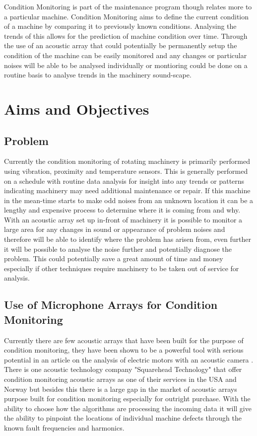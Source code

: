 \documentclass{UoNMCHA}
\numberwithin{equation}{section}
\begin{document}
    Condition Monitoring is part of the maintenance program though relates more to a particular machine. Condition Monitoring aims to define the current condition of a machine by comparing it to previously known conditions. Analysing the trends of this allows for the prediction of machine condition over time. Through the use of an acoustic array that could potentially be permanently setup the condition of the machine can be easily monitored and any changes or particular noises will be able to be analysed individually or montioring could be done on a routine basis to analyse trends in the machinery sound-scape.
\newpage
\section{Aims and Objectives} \label{sec:Aims and Objectives}
\subsection{Problem} \label{sec:Problem}
    Currently the condition monitoring of rotating machinery is primarily performed using vibration, proximity and temperature sensors. This is generally performed on a schedule with routine data analysis for insight into any trends or patterns indicating machinery may need additional maintenance or repair. If this machine in the mean-time starts to make odd noises from an unknown location it can be a lengthy and expensive process to determine where it is coming from and why. With an acoustic array set up in-front of machinery it is possible to monitor a large area for any changes in sound or appearance of problem noises and therefore will be able to identify where the problem has arisen from, even further it will be possible to analyse the noise further and potentially diagnose the problem. This could potentially save a great amount of time and money especially if other techniques require machinery to be taken out of service for analysis.
\subsection{Use of Microphone Arrays for Condition Monitoring} \label{sec:use for CM}
    Currently there are few acoustic arrays that have been built for the purpose of condition monitoring, they have been shown to be a powerful tool with serious potential in an article on the analysis of electric motors with an acoustic camera \citep{Orm13}. There is one acoustic technology company "Squarehead Technology" that offer condition monitoring acoustic arrays as one of their services in the USA and Norway but besides this there is a large gap in the market of acoustic arrays purpose built for condition monitoring especially for outright purchase. With the ability to choose how the algorithms are processing the incoming data it will give the ability to pinpoint the locations of individual machine defects through the known fault frequencies and harmonics.
\end{document}
